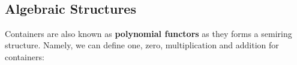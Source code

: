 \begin{code}%
\>[0]\AgdaSpace{}%
\AgdaSymbol{:}\AgdaSpace{}%
\AgdaSpace{}%
\AgdaSpace{}%
\AgdaSpace{}%
\AgdaSpace{}%
\AgdaSymbol{(}\AgdaSpace{}%
\AgdaSymbol{:}\AgdaSpace{}%
\AgdaSymbol{)}\AgdaSpace{}%
\AgdaSpace{}%
\AgdaSpace{}%
\AgdaSpace{}%
\AgdaSpace{}%
\AgdaSpace{}%
\AgdaSpace{}%
\AgdaSpace{}%
\AgdaSpace{}%
\AgdaSpace{}%
\<%
\\
\>[0]\AgdaSpace{}%
\AgdaSpace{}%
\AgdaSpace{}%
\AgdaSpace{}%
\AgdaSpace{}%
\AgdaSpace{}%
\AgdaSymbol{(}\AgdaSpace{}%
\AgdaOperator{\AgdaInductiveConstructor{,}}\AgdaSpace{}%
\AgdaSymbol{)}\AgdaSpace{}%
\AgdaSymbol{=}\AgdaSpace{}%
\AgdaSpace{}%
\AgdaSpace{}%
\AgdaOperator{\AgdaInductiveConstructor{,}}\AgdaSpace{}%
\AgdaSpace{}%
\AgdaSpace{}%
\AgdaSpace{}%
\<%
\end{code}

\subsection{Algebraic Structures}

Containers are also known as \textbf{polynomial functors} as they forms a semiring structure. Namely, we can define one, zero, multiplication and addition for containers:

